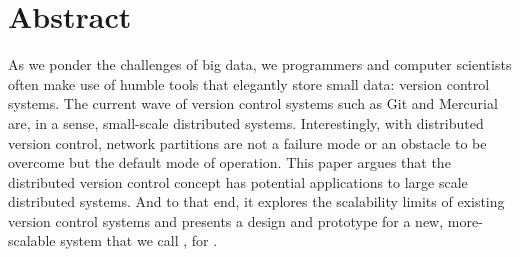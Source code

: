 \chapter{Abstract}

As we ponder the challenges of big data, we programmers and computer scientists
often make use of humble tools that elegantly store small data: version control
systems. The current wave of version control systems such as Git and Mercurial
are, in a sense, small-scale distributed systems. Interestingly, with
distributed version control, network partitions are not a failure mode or an
obstacle to be overcome but the default mode of operation. This paper argues
that the distributed version control concept has potential applications to large
scale distributed systems. And to that end, it explores the scalability limits
of existing version control systems and presents a design and prototype for a
new, more-scalable system that we call , for .
